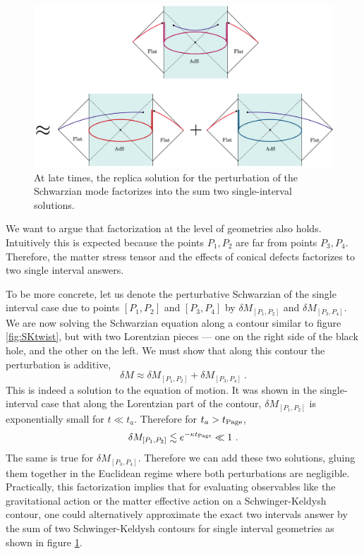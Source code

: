 \documentclass[12pt]{article}
\newcommand{\be}{\begin{equation}}
\newcommand{\ee}{\end{equation}}
\def\be{\begin{eqnarray}}
\def\ee{\end{eqnarray}}
\def\be{\begin{equation}}
\def\ee{\end{equation}}
\numberwithin{equation}{section}
\def\be{\begin{equation}}
\def\ee{\end{equation}}
\def \be {\begin{equation}}
\def \ee {\end{equation}}
\begin{document}
\begin{spacing}{1.1}
\begin{figure}[h!]
\centering
\includegraphics[scale=0.17]{./figures/picture_two_interval2.jpg}
\caption{At late times, the replica solution for the perturbation of the Schwarzian mode factorizes into the sum two single-interval solutions.} \label{cartoon_factorization}
\end{figure}

We want to argue that factorization at the level of geometries also holds.  Intuitively this is expected because the points $P_1, P_2$ are far from points $P_3, P_4$. Therefore, the matter stress tensor and the effects of conical defects factorizes to two single interval answers. 

To be more concrete, let us denote the perturbative Schwarzian of the single interval case due to points $[P_1, P_2]$ and $[P_3, P_4]$ by $\delta M_{[P_1, P_2]}$ and $\delta M_{[P_3, P_4]}$. We are now solving the Schwarzian equation along a contour similar to figure \ref{fig:SKtwist}, but with two Lorentzian pieces --- one on the right side of the black hole, and the other on the left. We must show that along this contour the perturbation is additive,
\be
\delta M \approx \delta M_{[P_1, P_2]} + \delta M_{[P_3, P_4]}  \ .
\ee
This is indeed a solution to the equation of motion. It was shown in the single-interval case that along the Lorentzian part of the contour, $\delta M_{[P_1, P_2]}$ is exponentially small for $ t \ll t_a$.  Therefore for $t_a > t_{\rm Page}$,
\be
\delta M_{[P_1, P_2]} \lesssim e^{-\kappa t_{\rm Page}} \ll 1 \ .
\ee
The same is true for $\delta M_{[P_3, P_4]} $.  Therefore we can add these two solutions, gluing them together in the Euclidean regime where both perturbations are negligible.
Practically, this factorization implies that for evaluating observables like the gravitational action or the matter effective action on a Schwinger-Keldysh contour, one could alternatively approximate the exact two intervals answer by the sum of two Schwinger-Keldysh contours for single interval geometries as shown in figure \ref{cartoon_factorization}. 


\end{spacing}
\end{document}
